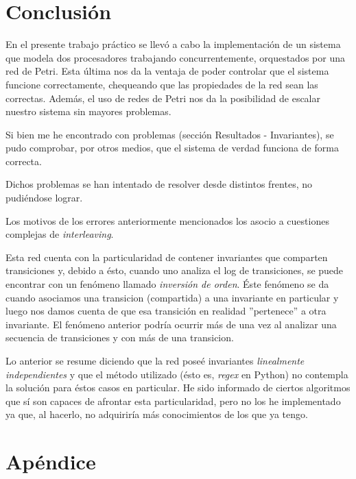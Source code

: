 \documentclass{article}
\begin{document}
    \section{Conclusión}
    En el presente trabajo práctico se llevó a cabo la implementación de un sistema que modela
    dos procesadores trabajando concurrentemente, orquestados por una red de Petri. Esta última
    nos da la ventaja de poder controlar que el sistema funcione correctamente, chequeando que
    las propiedades de la red sean las correctas. Además, el uso de redes de Petri nos da la 
    posibilidad de escalar nuestro sistema sin mayores problemas. \par
    Si bien me he encontrado con problemas (sección Resultados - Invariantes), se pudo 
    comprobar, por otros medios, que el sistema de verdad funciona de forma correcta. \par
    Dichos problemas se han intentado de resolver desde distintos frentes, no pudiéndose 
    lograr. \newline \par
    Los motivos de los errores anteriormente mencionados los asocio a cuestiones complejas
    de \emph{interleaving}. \par 
    Esta red cuenta con la particularidad de contener invariantes que comparten transiciones 
    y, debido a ésto, cuando uno analiza el log de transiciones, se puede encontrar con un 
    fenómeno llamado \emph{inversión de orden}. Éste fenómeno se da cuando asociamos una 
    transicion (compartida) a una invariante en particular y luego nos damos cuenta de que esa
    transición en realidad ''pertenece'' a otra invariante. El fenómeno anterior podría ocurrir 
    más de una vez al analizar una secuencia de transiciones y con más de una transicion. \par
    Lo anterior se resume diciendo que la red poseé invariantes \emph{linealmente independientes}
    y que el método utilizado (ésto es, \emph{regex} en Python) no contempla la solución para
    éstos casos en particular. He sido informado de ciertos algoritmos que sí son capaces de
    afrontar esta particularidad, pero no los he implementado ya que, al hacerlo, no adquiriría
    más conocimientos de los que ya tengo. \par
    \newpage 
    \section{Apéndice}
\end{document}

